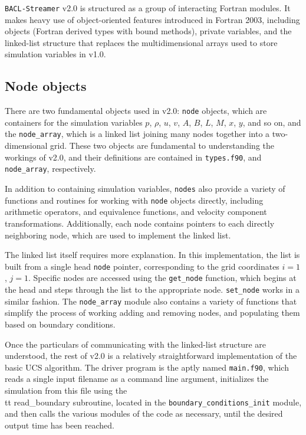 {\tt BACL-Streamer} v2.0 is structured as a group of interacting Fortran modules. It makes heavy use of object-oriented features introduced in Fortran 2003, including objects (Fortran derived types with bound methods), private variables, and the linked-list structure that replaces the multidimensional arrays used to store simulation variables in v1.0. 

\subsection{Node objects}
There are two fundamental objects used in v2.0: {\tt node} objects, which are containers for the simulation variables $p$, $\rho$, $u$, $v$, $A$, $B$, $L$, $M$, $x$, $y$, and so on, and the {\tt node\_array}, which is a linked list joining many nodes together into a two-dimensional grid. These two objects are fundamental to understanding the workings of v2.0, and their definitions are contained in {\tt types.f90}, and {\tt node\_array}, respectively. 

In addition to containing simulation variables, {\tt nodes} also provide a variety of functions and routines for working with {\tt node} objects directly, including arithmetic operators, and equivalence functions, and velocity component transformations. Additionally, each node contains pointers to each directly neighboring node, which are used to implement the linked list. 

The linked list itself requires more explanation. In this implementation, the list is built from a single head {\tt node} pointer, corresponding to the grid coordinates $i=1$, $j=1$. Specific nodes are accessed using the {\tt get\_node} function, which begins at the head and steps through the list to the appropriate node. {\tt set\_node} works in a similar fashion. The {\tt node\_array} module also contains a variety of functions that simplify the process of working adding and removing nodes, and populating them based on boundary conditions. 

Once the particulars of communicating with the linked-list structure are understood, the rest of v2.0 is a relatively straightforward implementation of the basic UCS algorithm. The driver program is the aptly named {\tt main.f90}, which reads a single input filename as a command line argument, initializes the simulation from this file using the {\\tt read\_boundary} subroutine, located in the {\tt boundary\_conditions\_init} module, and then calls the various modules of the code as necessary, until the desired output time has been reached. 

